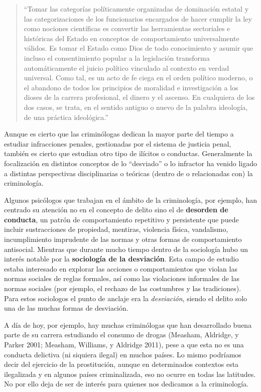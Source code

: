 \documentclass[
  spanish,
  letterpaper,
  DIV=11,
  numbers=noendperiod]{scrreprt}
\begin{document}
\begin{quote}
``Tomar las categorías políticamente organizadas de dominación estatal y
las categorizaciones de los funcionarios encargados de hacer cumplir la
ley como nociones científicas es convertir las herramientas sectoriales
e históricas del Estado en conceptos de comportamiento universalmente
válidos. Es tomar el Estado como Dios de todo conocimiento y asumir que
incluso el consentimiento popular a la legislación transforma
automáticamente el juicio político vinculado al contexto en verdad
universal. Como tal, es un acto de fe ciega en el orden político
moderno, o el abandono de todos los principios de moralidad e
investigación a los dioses de la carrera profesional, el dinero y el
ascenso. En cualquiera de los dos casos, se trata, en el sentido antiguo
o nuevo de la palabra ideología, de una práctica ideológica.''
\end{quote}

Aunque es cierto que las criminólogas dedican la mayor parte del tiempo
a estudiar infracciones penales, gestionadas por el sistema de justicia
penal, también es cierto que estudian otro tipo de ilícitos o conductas.
Generalmente la focalización en distintos conceptos de lo ``desviado'' o
lo infractor ha venido ligado a distintas perspectivas disciplinarias o
teóricas (dentro de o relacionadas con) la criminología.

Algunos psicólogos que trabajan en el ámbito de la criminología, por
ejemplo, han centrado su atención no en el concepto de delito sino el de
\textbf{desorden de conducta}, un patrón de comportamiento repetitivo y
persistente que puede incluir sustracciones de propiedad, mentiras,
violencia física, vandalismo, incumplimiento imprudente de las normas y
otras formas de comportamiento antisocial. Mientras que durante mucho
tiempo dentro de la sociología hubo un interés notable por la
\textbf{sociología de la desviación}. Esta campo de estudio estaba
interesado en explorar las acciones o comportamientos que violan las
normas sociales de reglas formales, así como las violaciones informales
de las normas sociales (por ejemplo, el rechazo de las costumbres y las
tradiciones). Para estos sociologos el punto de anclaje era la
\emph{desviación}, siendo el delito solo una de las muchas formas de
desviación.

A día de hoy, por ejemplo, hay muchas criminólogas que han desarrollado
buena parte de su carrera estudiando el consumo de drogas (Measham,
Aldridge, y Parker 2001; Measham, Williams, y Aldridge 2011), pese a que
esta no es una conducta delictiva (ni siquiera ilegal) en muchos países.
Lo mismo podríamos decir del ejercicio de la prostitución, aunque en
determinados contextos esta ilegalizada y en algunos países
criminalizada, eso no ocurre en todas las latitudes. No por ello deja de
ser de interés para quienes nos dedicamos a la criminología.
\end{document}
